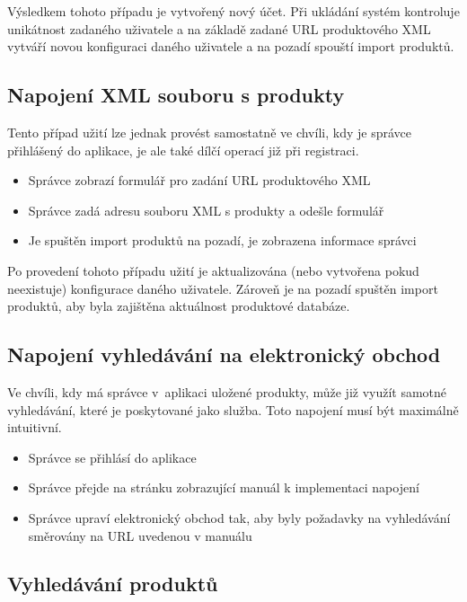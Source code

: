 \documentclass[FM,DP]{tulthesis}
\begin{document}
Výsledkem tohoto případu je vytvořený nový účet. Při ukládání systém kontroluje unikátnost
zadaného uživatele a na základě zadané URL produktového XML vytváří novou konfiguraci
daného uživatele a na pozadí spouští import produktů.

\subsection{Napojení XML souboru s produkty}

Tento případ užití lze jednak provést samostatně ve chvíli, kdy je správce přihlášený
do aplikace, je ale také dílčí operací již při registraci.

\begin{itemize}
\item Správce zobrazí formulář pro zadání URL produktového XML
\item Správce zadá adresu souboru XML s produkty a odešle formulář
\item Je spuštěn import produktů na pozadí, je zobrazena informace správci
\end{itemize}

Po provedení tohoto případu užití je aktualizována (nebo vytvořena pokud neexistuje) 
konfigurace daného uživatele. Zároveň je na pozadí spuštěn import produktů, aby byla
zajištěna aktuálnost produktové databáze.

\subsection{Napojení vyhledávání na elektronický obchod}

Ve chvíli, kdy má správce v~aplikaci uložené produkty, může již využít samotné vyhledávání,
které je poskytované jako služba. Toto napojení musí být maximálně intuitivní.

\begin{itemize}
\item Správce se přihlásí do aplikace
\item Správce přejde na stránku zobrazující manuál k implementaci napojení
\item Správce upraví elektronický obchod tak, aby byly požadavky na vyhledávání
směrovány na URL uvedenou v manuálu
\end{itemize}

\subsection{Vyhledávání produktů}
\end{document}
